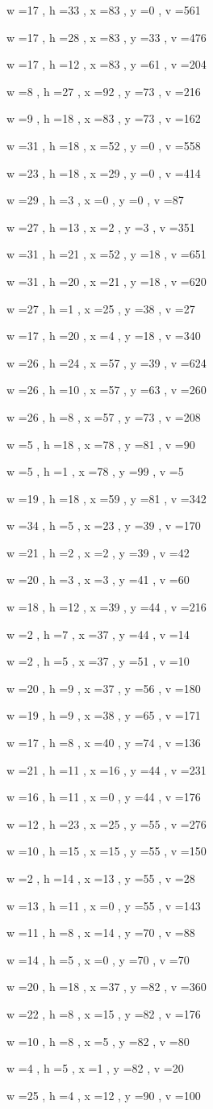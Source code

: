 \documentclass[11pt]{article}
\begin{document}
w =17 , h =33 , x =83 , y =0 , v =561
\par
w =17 , h =28 , x =83 , y =33 , v =476
\par
w =17 , h =12 , x =83 , y =61 , v =204
\par
w =8 , h =27 , x =92 , y =73 , v =216
\par
w =9 , h =18 , x =83 , y =73 , v =162
\par
w =31 , h =18 , x =52 , y =0 , v =558
\par
w =23 , h =18 , x =29 , y =0 , v =414
\par
w =29 , h =3 , x =0 , y =0 , v =87
\par
w =27 , h =13 , x =2 , y =3 , v =351
\par
w =31 , h =21 , x =52 , y =18 , v =651
\par
w =31 , h =20 , x =21 , y =18 , v =620
\par
w =27 , h =1 , x =25 , y =38 , v =27
\par
w =17 , h =20 , x =4 , y =18 , v =340
\par
w =26 , h =24 , x =57 , y =39 , v =624
\par
w =26 , h =10 , x =57 , y =63 , v =260
\par
w =26 , h =8 , x =57 , y =73 , v =208
\par
w =5 , h =18 , x =78 , y =81 , v =90
\par
w =5 , h =1 , x =78 , y =99 , v =5
\par
w =19 , h =18 , x =59 , y =81 , v =342
\par
w =34 , h =5 , x =23 , y =39 , v =170
\par
w =21 , h =2 , x =2 , y =39 , v =42
\par
w =20 , h =3 , x =3 , y =41 , v =60
\par
w =18 , h =12 , x =39 , y =44 , v =216
\par
w =2 , h =7 , x =37 , y =44 , v =14
\par
w =2 , h =5 , x =37 , y =51 , v =10
\par
w =20 , h =9 , x =37 , y =56 , v =180
\par
w =19 , h =9 , x =38 , y =65 , v =171
\par
w =17 , h =8 , x =40 , y =74 , v =136
\par
w =21 , h =11 , x =16 , y =44 , v =231
\par
w =16 , h =11 , x =0 , y =44 , v =176
\par
w =12 , h =23 , x =25 , y =55 , v =276
\par
w =10 , h =15 , x =15 , y =55 , v =150
\par
w =2 , h =14 , x =13 , y =55 , v =28
\par
w =13 , h =11 , x =0 , y =55 , v =143
\par
w =11 , h =8 , x =14 , y =70 , v =88
\par
w =14 , h =5 , x =0 , y =70 , v =70
\par
w =20 , h =18 , x =37 , y =82 , v =360
\par
w =22 , h =8 , x =15 , y =82 , v =176
\par
w =10 , h =8 , x =5 , y =82 , v =80
\par
w =4 , h =5 , x =1 , y =82 , v =20
\par
w =25 , h =4 , x =12 , y =90 , v =100
\par
\newpage
\end{document}
